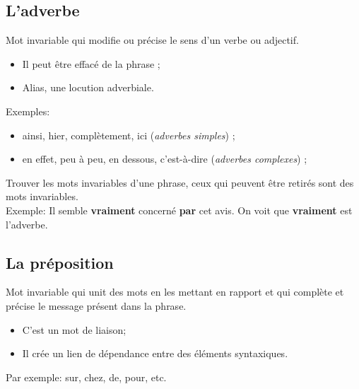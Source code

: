 \documentclass[10pt, french]{article}
\begin{document}
\begin{multicols*}{2}
\subsection{L'adverbe}
\begin{definitionNOHFILLsub}[Adverbe]
Mot invariable qui modifie ou précise le sens d'un verbe ou adjectif.
\begin{itemize}
	\item	Il peut être effacé de la phrase ;
	\item	Alias, une locution adverbiale.
\end{itemize}

\tcbline

Exemples:
\begin{itemize}
	\item	ainsi, hier, complètement, ici (\textit{adverbes simples}) ;
	\item	en effet, peu à peu, en dessous, c'est-à-dire (\textit{adverbes complexes}) ;
\end{itemize}
\begin{astuces}
Trouver les mots invariables d'une phrase, ceux qui peuvent être retirés sont des mots invariables.\\
Exemple:	Il semble \textbf{\color{teal}vraiment} concerné \textbf{par} cet avis. On voit que \textbf{\color{teal}vraiment} est l'adverbe.
\end{astuces}
\end{definitionNOHFILLsub}

\subsection{La préposition}
\begin{definitionNOHFILL}[La préposition]
Mot invariable qui unit des mots en les mettant en rapport et qui complète et précise le message présent dans la phrase.
\begin{itemize}
	\item	C'est un mot de liaison;
	\item	Il crée un lien de dépendance entre des éléments syntaxiques.
\end{itemize}

\tcbline

Par exemple:	sur, chez, de, pour, etc.
\end{definitionNOHFILL}


\end{multicols*}
\end{document}
